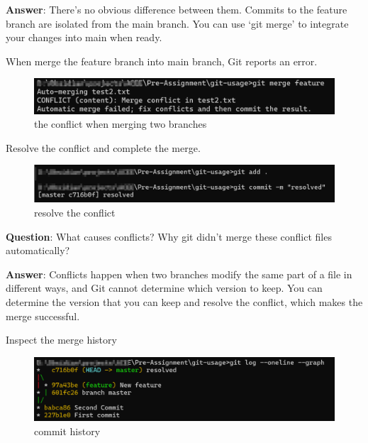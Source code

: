 \documentclass{article}
\begin{document}
\textbf{Answer}: There's no obvious difference between them. Commits to the feature branch are isolated from the main branch. You can use `git merge' to integrate your changes into main when ready.

When merge the feature branch into main branch, Git reports an error.
\begin{figure}[H]
\centering
\includegraphics[width = \textwidth]{../figures/conflict.png}
\caption{the conflict when merging two branches}
\end{figure}
Resolve the conflict and complete the merge.
\begin{figure}[H]
\centering
\includegraphics[width = \textwidth]{../figures/resolved.png}
\caption{resolve the conflict}
\end{figure}

\textbf{Question}: What causes conflicts? Why git didn't merge these conflict files automatically?

\textbf{Answer}: Conflicts happen when two branches modify the same part of a file in different ways, and Git cannot determine which version to keep.
You can determine the version that you can keep and resolve the conflict, which makes the merge successful.

Inspect the merge history
\begin{figure}[H]
    \centering
    \includegraphics[width = \textwidth]{../figures/graph.png}
    \caption{commit history}
\end{figure}
\end{document}
